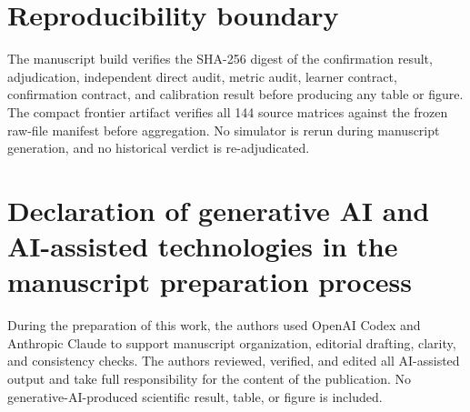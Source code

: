 \documentclass[preprint,12pt]{elsarticle}
\begin{document}
\appendix
\section{Reproducibility boundary}

The manuscript build verifies the SHA-256 digest of the confirmation result, adjudication, independent direct audit, metric audit, learner contract, confirmation contract, and calibration result before producing any table or figure. The compact frontier artifact verifies all 144 source matrices against the frozen raw-file manifest before aggregation. No simulator is rerun during manuscript generation, and no historical verdict is re-adjudicated.

\section*{Declaration of generative AI and AI-assisted technologies in the manuscript preparation process}

During the preparation of this work, the authors used OpenAI Codex and Anthropic Claude to support manuscript organization, editorial drafting, clarity, and consistency checks. The authors reviewed, verified, and edited all AI-assisted output and take full responsibility for the content of the publication. No generative-AI-produced scientific result, table, or figure is included.



\end{document}
